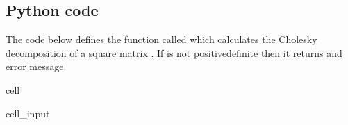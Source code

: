 \documentclass[letterpaper,10pt,english]{jupyterBook}
\begin{document}
\subsection{Python code}
\label{\detokenize{6_Direct_methods/6.3_Cholesky_decomposition:python-code}}
\sphinxAtStartPar
The code below defines the function called  which calculates the Cholesky decomposition of a square matrix . If  is not positive\sphinxhyphen{}definite then it returns and error message.

\begin{sphinxuseclass}{cell}\begin{sphinxVerbatimInput}

\begin{sphinxuseclass}{cell_input}
\begin{sphinxVerbatim}[commandchars=\\\{\}]
 
      \PYG{p}{[}\PYG{p}{]}
       
         \PYG{p}{[}\PYG{p}{]}  
        
          
       
            
               
                \PYG{p}{[}\PYG{p}{]}  \PYG{p}{[}\PYG{p}{]}  \PYG{p}{[}\PYG{p}{]}
                
               
                \PYG{p}{[}\PYG{p}{]}  \PYG{p}{[}\PYG{p}{]}  \PYG{p}{[}\PYG{p}{]}
                \PYG{p}{[}\PYG{p}{]}    \PYG{p}{[}\PYG{p}{]}  \PYG{p}{[}\PYG{p}{]}  \PYG{p}{[}\PYG{p}{]}   
    

\end{sphinxVerbatim}
\end{sphinxuseclass}
\end{sphinxVerbatimInput}
\end{sphinxuseclass}
\end{document}
